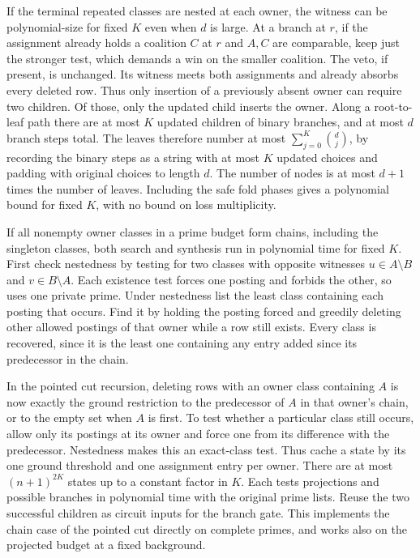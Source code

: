 If the terminal repeated classes are nested at each
owner, the witness can be polynomial-size for fixed
$K$ even when $d$ is large. At a branch at $r$, if
the assignment already holds a coalition $C$ at $r$
and $A,C$ are comparable, keep just the stronger
test, which demands a win on the smaller coalition.
The veto, if present, is unchanged. Its witness
meets both assignments and already absorbs every
deleted row. Thus only insertion of a previously
absent owner can require two children. Of those,
only the updated child inserts the owner. Along a
root-to-leaf path there are at most $K$ updated
children of binary branches, and at most $d$ branch
steps total. The leaves therefore number at most
$\sum_{j=0}^{K}\binom{d}{j}$, by recording the
binary steps as a string with at most $K$ updated
choices and padding with original choices to
length $d$. The number of nodes is at most $d+1$
times the number of leaves. Including the safe
fold phases gives a polynomial bound for fixed
$K$, with no bound on loss multiplicity.

If all nonempty owner classes in a prime budget form
chains, including the singleton classes, both search
and synthesis run in polynomial time for fixed $K$.
First check nestedness by testing for two classes
with opposite witnesses $u\in A\setminus B$ and
$v\in B\setminus A$. Each existence test forces
one posting and forbids the other, so uses one
private prime. Under nestedness list the least
class containing each posting that occurs. Find
it by holding the posting forced and greedily
deleting other allowed postings of that owner
while a row still exists. Every class is recovered,
since it is the least one containing any entry
added since its predecessor in the chain.

In the pointed cut recursion, deleting rows with
an owner class containing $A$ is now exactly the
ground restriction to the predecessor of $A$ in
that owner's chain, or to the empty set when $A$
is first. To test whether a particular class still
occurs, allow only its postings at its owner and
force one from its difference with the predecessor.
Nestedness makes this an exact-class test.
Thus cache a state by its one ground threshold
and one assignment entry per owner. There are at
most $(n+1)^{2K}$ states up to a constant factor
in $K$. Each tests projections and possible
branches in polynomial time with the original
prime lists. Reuse the two successful children
as circuit inputs for the branch gate. This
implements the chain case of the pointed cut
directly on complete primes, and works also
on the projected budget at a fixed background.


